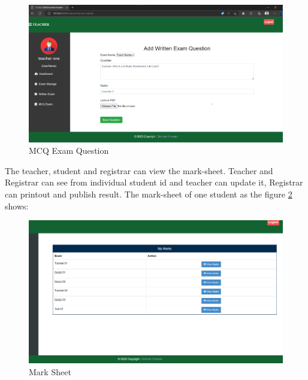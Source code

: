 \begin{figure}[H]
    \centering
    \includegraphics[scale=.36]{img/CT.png}
    \caption{MCQ Exam Question}
    \label{fig:CT}
\end{figure}
The teacher, student and registrar can view the mark-sheet. Teacher and Registrar can see from individual student id and teacher can update it, Registrar can printout and publish result. The mark-sheet of one student as the figure \ref{fig:mark} shows:
\begin{figure}[!h]
    \centering
    \includegraphics[scale=.4]{img/mark.png}
    \caption{Mark Sheet}
    \label{fig:mark}
\end{figure}

